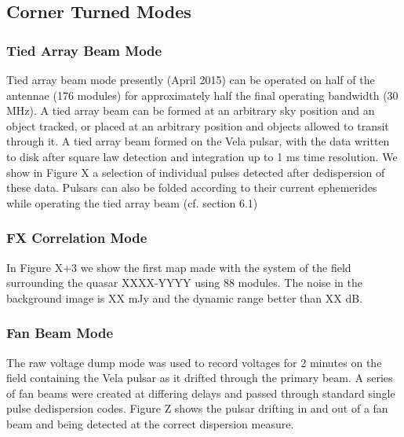 \subsection{Corner Turned Modes}
\subsubsection{Tied Array Beam Mode}

Tied array beam mode presently (April 2015) can be operated on half of the antennae (176 modules) for approximately half the final operating bandwidth (30 MHz). A tied array beam can be formed at an arbitrary sky position and an object tracked, or placed at an arbitrary position and objects allowed to transit through it. A tied array beam formed on the Vela pulsar, with the data written to disk after square law detection and integration up to 1 ms time resolution. We show in Figure X a selection of individual pulses detected after dedispersion of these data. Pulsars can also be folded according to their current ephemerides while operating the tied array beam (cf. section 6.1) 

\subsubsection{FX Correlation Mode}

In Figure X+3 we show the first map made with the system of the field surrounding the quasar XXXX-YYYY using 88 modules. The noise in the background image is XX mJy and the dynamic range better than XX dB.

\subsubsection{Fan Beam Mode}

The raw voltage dump mode was used to record voltages for 2 minutes on the field containing the Vela pulsar as it drifted through the primary beam. A series of fan beams were created at differing delays and passed through standard single pulse dedispersion codes. Figure Z shows the pulsar drifting in and out of a fan beam and being detected at the correct dispersion measure.

